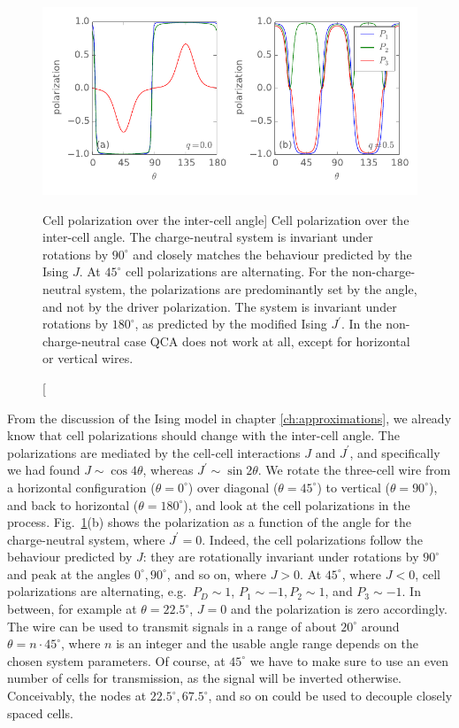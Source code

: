 %
\begin{figure}
  \center
  \includegraphics{three_cells_P_over_theta}
  \caption
  [Cell polarization over the inter-cell angle]
  {
  Cell polarization over the inter-cell angle. The charge-neutral system is
  invariant under rotations by $90^{\circ}$ and closely matches the behaviour
  predicted by the Ising $J$. At $45^{\circ}$ cell polarizations are
  alternating. For the non-charge-neutral system, the polarizations are
  predominantly set by the angle, and not by the driver polarization. The system
  is invariant under rotations by $180^{\circ}$, as predicted by the modified
  Ising $J^{\prime}$. In the non-charge-neutral case QCA does not work at all,
  except for horizontal or vertical wires.
  }
  \label{fig:three_cells_P_over_theta}
\end{figure}
%
From the discussion of the Ising model in chapter \ref{ch:approximations}, we
already know that cell polarizations should change with the inter-cell angle.
The polarizations are mediated by the cell-cell interactions $J$ and
$J^{\prime}$, and specifically we had found $J \sim \cos{4 \theta}$, whereas
$J^{\prime} \sim \sin{2 \theta}$. We rotate the three-cell wire from a
horizontal configuration ($\theta = 0^{\circ}$) over diagonal ($\theta =
45^{\circ}$) to vertical ($\theta = 90^{\circ}$), and back to horizontal
($\theta = 180^{\circ}$), and look at the cell polarizations in the process.
Fig.~\ref{fig:three_cells_P_over_theta}(b) shows the polarization as a function
of the angle for the charge-neutral system, where $J^{\prime} = 0$. Indeed, the
cell polarizations follow the behaviour predicted by $J$: they are rotationally
invariant under rotations by $90^{\circ}$ and peak at the angles $0^{\circ},
90^{\circ}$, and so on, where $J > 0$. At $45^{\circ}$, where $J < 0$, cell
polarizations are alternating, e.g.~$P_D \sim 1$, $P_1 \sim -1, P_2 \sim 1$, and
$P_3 \sim -1$. In between, for example at $\theta = 22.5^{\circ}$, $J = 0$ and
the polarization is zero accordingly. The wire can be used to transmit signals
in a range of about $20^{\circ}$ around $\theta = n \cdot 45^{\circ}$, where $n$
is an integer and the usable angle range depends on the chosen system
parameters. Of course, at $45^{\circ}$ we have to make sure to use an even
number of cells for transmission, as the signal will be inverted otherwise.
Conceivably, the nodes at $22.5^{\circ}, 67.5^{\circ}$, and so on could be used
to decouple closely spaced cells.

